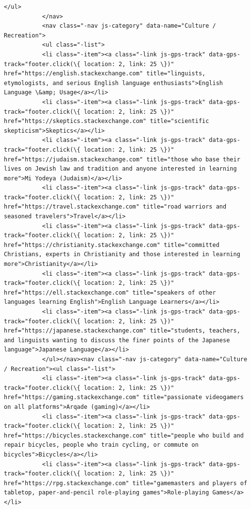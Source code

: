\documentclass[11pt]{article}
\begin{document}
\begin{Verbatim}[commandchars=\\\{\}]
           </ul>
           </nav>
           <nav class="-nav js-category" data-name="Culture / Recreation">
           <ul class="-list">
           <li class="-item"><a class="-link js-gps-track" data-gps-track="footer.click(\{ location: 2, link: 25 \})" href="https://english.stackexchange.com" title="linguists, etymologists, and serious English language enthusiasts">English Language \&amp; Usage</a></li>
           <li class="-item"><a class="-link js-gps-track" data-gps-track="footer.click(\{ location: 2, link: 25 \})" href="https://skeptics.stackexchange.com" title="scientific skepticism">Skeptics</a></li>
           <li class="-item"><a class="-link js-gps-track" data-gps-track="footer.click(\{ location: 2, link: 25 \})" href="https://judaism.stackexchange.com" title="those who base their lives on Jewish law and tradition and anyone interested in learning more">Mi Yodeya (Judaism)</a></li>
           <li class="-item"><a class="-link js-gps-track" data-gps-track="footer.click(\{ location: 2, link: 25 \})" href="https://travel.stackexchange.com" title="road warriors and seasoned travelers">Travel</a></li>
           <li class="-item"><a class="-link js-gps-track" data-gps-track="footer.click(\{ location: 2, link: 25 \})" href="https://christianity.stackexchange.com" title="committed Christians, experts in Christianity and those interested in learning more">Christianity</a></li>
           <li class="-item"><a class="-link js-gps-track" data-gps-track="footer.click(\{ location: 2, link: 25 \})" href="https://ell.stackexchange.com" title="speakers of other languages learning English">English Language Learners</a></li>
           <li class="-item"><a class="-link js-gps-track" data-gps-track="footer.click(\{ location: 2, link: 25 \})" href="https://japanese.stackexchange.com" title="students, teachers, and linguists wanting to discuss the finer points of the Japanese language">Japanese Language</a></li>
           </ul></nav><nav class="-nav js-category" data-name="Culture / Recreation"><ul class="-list">
           <li class="-item"><a class="-link js-gps-track" data-gps-track="footer.click(\{ location: 2, link: 25 \})" href="https://gaming.stackexchange.com" title="passionate videogamers on all platforms">Arqade (gaming)</a></li>
           <li class="-item"><a class="-link js-gps-track" data-gps-track="footer.click(\{ location: 2, link: 25 \})" href="https://bicycles.stackexchange.com" title="people who build and repair bicycles, people who train cycling, or commute on bicycles">Bicycles</a></li>
           <li class="-item"><a class="-link js-gps-track" data-gps-track="footer.click(\{ location: 2, link: 25 \})" href="https://rpg.stackexchange.com" title="gamemasters and players of tabletop, paper-and-pencil role-playing games">Role-playing Games</a></li>

\end{Verbatim}
\end{document}
